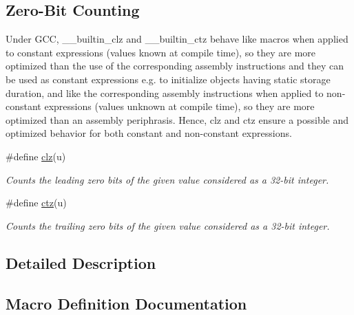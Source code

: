 \subsection*{Zero-\/\+Bit Counting}
\label{_amgrpd7e64f1bf7ad6347e17b23a92fc56d83}%
Under G\+CC, \+\_\+\+\_\+builtin\+\_\+clz and \+\_\+\+\_\+builtin\+\_\+ctz behave like macros when applied to constant expressions (values known at compile time), so they are more optimized than the use of the corresponding assembly instructions and they can be used as constant expressions e.\+g. to initialize objects having static storage duration, and like the corresponding assembly instructions when applied to non-\/constant expressions (values unknown at compile time), so they are more optimized than an assembly periphrasis. Hence, clz and ctz ensure a possible and optimized behavior for both constant and non-\/constant expressions. \begin{DoxyCompactItemize}
\item 
\#define \hyperlink{group__doc__driver__hal__utils__macro_ga004f88903a09b9c23017e697eaf5a845}{clz}(u)
\begin{DoxyCompactList}\small\item\em Counts the leading zero bits of the given value considered as a 32-\/bit integer. \end{DoxyCompactList}\item 
\#define \hyperlink{group__doc__driver__hal__utils__macro_gab069bfec305db5213465d3b689836404}{ctz}(u)
\begin{DoxyCompactList}\small\item\em Counts the trailing zero bits of the given value considered as a 32-\/bit integer. \end{DoxyCompactList}\end{DoxyCompactItemize}


\subsection{Detailed Description}


\subsection{Macro Definition Documentation}
\mbox{\label{group__doc__driver__hal__utils__macro_ga25f003de16c08a4888b69f619d70f427}} 
